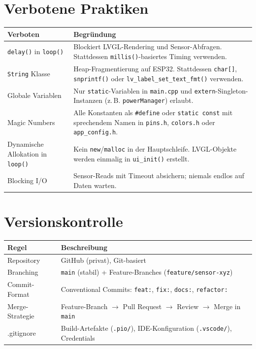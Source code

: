 \documentclass[a4paper,11pt]{article}
\begin{document}
\section{Verbotene Praktiken}

\begin{tabularx}{\textwidth}{lX}
\toprule
\rowcolor{tableheader}
\textbf{Verboten} & \textbf{Begründung} \\
\midrule
\texttt{delay()} in \texttt{loop()} & Blockiert LVGL-Rendering und Sensor-Abfragen. Stattdessen \texttt{millis()}-basiertes Timing verwenden. \\
\texttt{String} Klasse & Heap-Fragmentierung auf ESP32. Stattdessen \texttt{char[]}, \texttt{snprintf()} oder \texttt{lv\_label\_set\_text\_fmt()} verwenden. \\
Globale Variablen & Nur \texttt{static}-Variablen in \texttt{main.cpp} und \texttt{extern}-Singleton-Instanzen (z.\,B. \texttt{powerManager}) erlaubt. \\
Magic Numbers & Alle Konstanten als \texttt{\#define} oder \texttt{static const} mit sprechendem Namen in \texttt{pins.h}, \texttt{colors.h} oder \texttt{app\_config.h}. \\
Dynamische Allokation in \texttt{loop()} & Kein \texttt{new}/\texttt{malloc} in der Hauptschleife. LVGL-Objekte werden einmalig in \texttt{ui\_init()} erstellt. \\
Blocking I/O & Sensor-Reads mit Timeout absichern; niemals endlos auf Daten warten. \\
\bottomrule
\end{tabularx}

\section{Versionskontrolle}

\begin{tabularx}{\textwidth}{lX}
\toprule
\rowcolor{tableheader}
\textbf{Regel} & \textbf{Beschreibung} \\
\midrule
Repository & GitHub (privat), Git-basiert \\
Branching & \texttt{main} (stabil) + Feature-Branches (\texttt{feature/sensor-xyz}) \\
Commit-Format & Conventional Commits: \texttt{feat:}, \texttt{fix:}, \texttt{docs:}, \texttt{refactor:} \\
Merge-Strategie & Feature-Branch $\to$ Pull Request $\to$ Review $\to$ Merge in \texttt{main} \\
.gitignore & Build-Artefakte (\texttt{.pio/}), IDE-Konfiguration (\texttt{.vscode/}), Credentials \\
\bottomrule
\end{tabularx}
\end{document}
